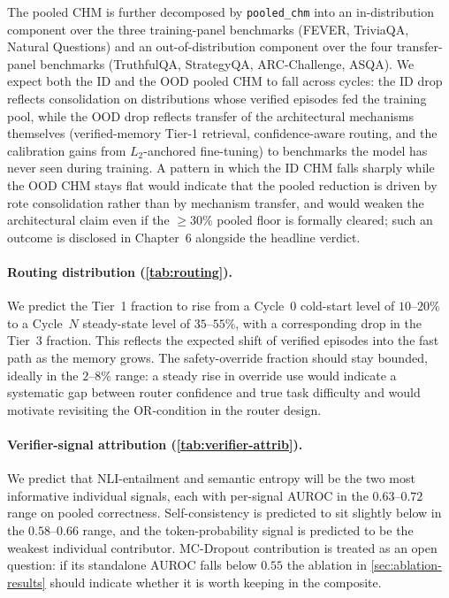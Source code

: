 The pooled CHM is further decomposed by \texttt{pooled\_chm} into an in-distribution component over the three training-panel benchmarks (FEVER, TriviaQA, Natural Questions) and an out-of-distribution component over the four transfer-panel benchmarks (TruthfulQA, StrategyQA, ARC-Challenge, ASQA). We expect both the ID and the OOD pooled CHM to fall across cycles: the ID drop reflects consolidation on distributions whose verified episodes fed the training pool, while the OOD drop reflects transfer of the architectural mechanisms themselves (verified-memory Tier-1 retrieval, confidence-aware routing, and the calibration gains from $L_{2}$-anchored fine-tuning) to benchmarks the model has never seen during training. A pattern in which the ID CHM falls sharply while the OOD CHM stays flat would indicate that the pooled reduction is driven by rote consolidation rather than by mechanism transfer, and would weaken the architectural claim even if the $\geq 30\%$ pooled floor is formally cleared; such an outcome is disclosed in Chapter~6 alongside the headline verdict.

\paragraph{Routing distribution (\cref{tab:routing}).}
We predict the Tier~1 fraction to rise from a Cycle~$0$ cold-start
level of $10$--$20\%$ to a Cycle~$N$ steady-state level of
$35$--$55\%$, with a corresponding drop in the Tier~3 fraction. This
reflects the expected shift of verified episodes into the fast path as
the memory grows. The safety-override fraction should stay bounded,
ideally in the $2$--$8\%$ range: a steady rise in override use would
indicate a systematic gap between router confidence and true task
difficulty and would motivate revisiting the OR-condition in the
router design.

\paragraph{Verifier-signal attribution (\cref{tab:verifier-attrib}).}
We predict that NLI-entailment and semantic entropy will be the two
most informative individual signals, each with per-signal AUROC in
the $0.63$--$0.72$ range on pooled correctness. Self-consistency is
predicted to sit slightly below in the $0.58$--$0.66$ range, and the
token-probability signal is predicted to be the weakest individual
contributor. MC-Dropout contribution is treated as an open question:
if its standalone AUROC falls below $0.55$ the ablation in
\cref{sec:ablation-results} should indicate whether it is worth
keeping in the composite.

